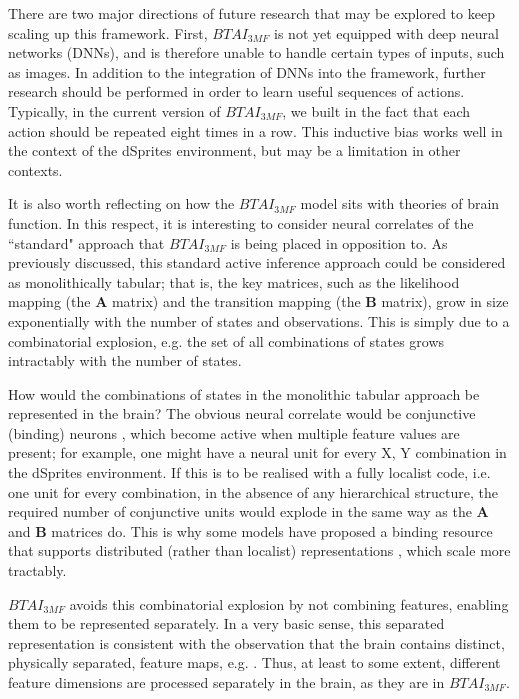 \documentclass[twoside,11pt]{article}
\begin{document}
There are two major directions of future research that may be explored to keep scaling up this framework. First, $BTAI_{3MF}$ is not yet equipped with deep neural networks (DNNs), and is therefore unable to handle certain types of inputs, such as images. In addition to the integration of DNNs into the framework, further research should be performed in order to learn useful sequences of actions. Typically, in the current version of $BTAI_{3MF}$, we built in the fact that each action should be repeated eight times in a row. This inductive bias works well in the context of the dSprites environment, but may be a limitation in other contexts.

It is also worth reflecting on how the $BTAI_{3MF}$ model sits with theories of brain function. In this respect, it is interesting to consider neural correlates of the ``standard" approach that $BTAI_{3MF}$ is being placed in opposition to. As previously discussed, this standard active inference approach could be considered as monolithically tabular; that is, the key matrices, such as the likelihood mapping (the $\bm{A}$ matrix) and the transition mapping (the $\bm{B}$ matrix), grow in size exponentially with the number of states and observations. This is simply due to a combinatorial explosion, e.g. the set of all combinations of states grows intractably with the number of states.

How would the combinations of states in the monolithic tabular approach be represented in the brain? The obvious neural correlate would be conjunctive (binding) neurons \citep{o2001conjunctive}, which become active when multiple feature values are present; for example, one might have a neural unit for every X, Y combination in the dSprites environment. If this is to be realised with a fully localist code, i.e. one unit for every combination, in the absence of any hierarchical structure, the required number of conjunctive units would explode in the same way as the $\bm{A}$ and $\bm{B}$ matrices do. This is why some models have proposed a binding resource that supports distributed (rather than localist) representations \citep{bowman2007simultaneous}, which scale more tractably.

$BTAI_{3MF}$ avoids this combinatorial explosion by not combining features, enabling them to be represented separately. In a very basic sense, this separated representation is consistent with the observation that the brain contains distinct, physically separated, feature maps, e.g. \citet{730558}. Thus, at least to some extent, different feature dimensions are processed separately in the brain, as they are in $BTAI_{3MF}$.
\end{document}

